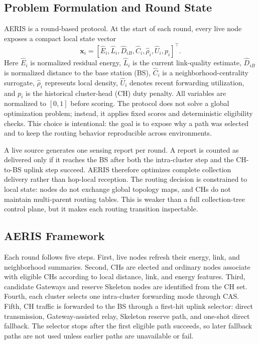 \documentclass[conference]{IEEEtran}
\begin{document}
\subsection{Problem Formulation and Round State}
AERIS is a round-based protocol. At the start of each round, every live node exposes a compact local state vector
\begin{equation}
\mathbf{x}_i=[\hat{E}_i,\hat{L}_i,\hat{D}_{iB},\hat{C}_i,\hat{\rho}_i,\hat{U}_i,p_i]^\top .
\end{equation}
Here $\hat{E}_i$ is normalized residual energy, $\hat{L}_i$ is the current link-quality estimate, $\hat{D}_{iB}$ is normalized distance to the base station (BS), $\hat{C}_i$ is a neighborhood-centrality surrogate, $\hat{\rho}_i$ represents local density, $\hat{U}_i$ denotes recent forwarding utilization, and $p_i$ is the historical cluster-head (CH) duty penalty. All variables are normalized to $[0,1]$ before scoring. The protocol does not solve a global optimization problem; instead, it applies fixed scores and deterministic eligibility checks. This choice is intentional: the goal is to expose why a path was selected and to keep the routing behavior reproducible across environments.

A live source generates one sensing report per round. A report is counted as delivered only if it reaches the BS after both the intra-cluster step and the CH-to-BS uplink step succeed. AERIS therefore optimizes complete collection delivery rather than hop-local reception. The routing decision is constrained to local state: nodes do not exchange global topology maps, and CHs do not maintain multi-parent routing tables. This is weaker than a full collection-tree control plane, but it makes each routing transition inspectable.

\subsection{AERIS Framework}
Each round follows five steps. First, live nodes refresh their energy, link, and neighborhood summaries. Second, CHs are elected and ordinary nodes associate with eligible CHs according to local distance, link, and energy features. Third, candidate Gateways and reserve Skeleton nodes are identified from the CH set. Fourth, each cluster selects one intra-cluster forwarding mode through CAS. Fifth, CH traffic is forwarded to the BS through a first-hit uplink selector: direct transmission, Gateway-assisted relay, Skeleton reserve path, and one-shot direct fallback. The selector stops after the first eligible path succeeds, so later fallback paths are not used unless earlier paths are unavailable or fail.
\end{document}
